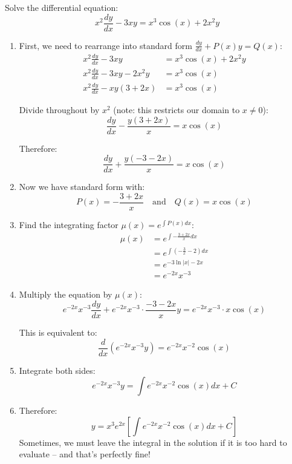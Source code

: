 \exampleline
\begin{example}
Solve the differential equation:
\[
x^2\frac{dy}{dx} - 3xy = x^3\cos(x) + 2x^2y
\]

\begin{solution}
\begin{enumerate}
\item First, we need to rearrange into standard form $\frac{dy}{dx} + P(x)y = Q(x)$:
   \begin{align*}
   x^2\frac{dy}{dx} - 3xy &= x^3\cos(x) + 2x^2y \\
   x^2\frac{dy}{dx} - 3xy - 2x^2y &= x^3\cos(x) \\
   x^2\frac{dy}{dx} - x y(3+2x) &= x^3\cos(x)
   \end{align*}
   
   Divide throughout by $x^2$ (note: this restricts our domain to $x \neq 0$):
   \[
   \frac{dy}{dx} - \frac{y(3+2x)}{x} = x\cos(x)
   \]
   
   Therefore:
   \[
   \frac{dy}{dx} + \frac{y(-3-2x)}{x} = x\cos(x)
   \]

\item Now we have standard form with:
   \[
   P(x) = -\frac{3+2x}{x} \quad \text{and} \quad Q(x) = x\cos(x)
   \]

\item Find the integrating factor $\mu(x) = e^{\int P(x)dx}$:
   \begin{align*}
   \mu(x) &= e^{\int -\frac{3+2x}{x}dx} \\
   &= e^{\int (-\frac{3}{x}-2)dx} \\
   &= e^{-3\ln|x|-2x} \\
   &= e^{-2x}x^{-3}
   \end{align*}

\item Multiply the equation by $\mu(x)$:
   \[
   e^{-2x}x^{-3}\frac{dy}{dx} + e^{-2x}x^{-3}\cdot\frac{-3-2x}{x}y = e^{-2x}x^{-3}\cdot x\cos(x)
   \]
   
   This is equivalent to:
   \[
   \frac{d}{dx}(e^{-2x}x^{-3}y) = e^{-2x}x^{-2}\cos(x)
   \]

\item Integrate both sides:
   \[
   e^{-2x}x^{-3}y = \int e^{-2x}x^{-2}\cos(x)dx + C
   \]

\item Therefore:
   \[
   y = x^3e^{2x}\left[\int e^{-2x}x^{-2}\cos(x)dx + C\right]
   \]
\noindent Sometimes, we must leave the integral in the solution if it is too hard to evaluate -- and that's perfectly fine!
\end{enumerate}

\end{solution}
\end{example}
\exampleline

